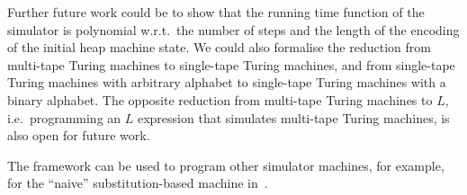 Further future work could be to show that the running time function of the simulator is polynomial w.r.t.\ the number of steps and the length of the
encoding of the initial heap machine state.  We could also formalise the reduction from multi-tape Turing machines to single-tape Turing machines, and
from single-tape Turing machines with arbitrary alphabet to single-tape Turing machines with a binary alphabet.  The opposite reduction from
multi-tape Turing machines to $L$, i.e.\ programming an $L$ expression that simulates multi-tape Turing machines, is also open for future work.

The framework can be used to program other simulator machines, for example, for the ``naive'' substitution-based machine
in~\cite{KunzeEtAl:2018:Formal}.


